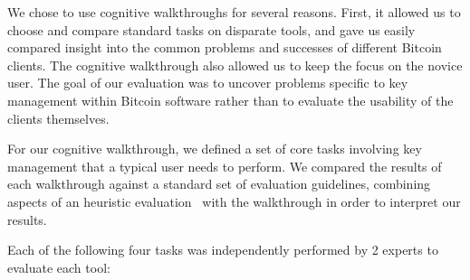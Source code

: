 We chose to use cognitive walkthroughs for several reasons. First, it allowed us to choose and compare standard tasks on disparate tools, and gave us easily compared insight into the common problems and successes of different Bitcoin clients. The cognitive walkthrough also allowed us to keep the focus on the novice user. The goal of our evaluation was to uncover problems specific to key management within Bitcoin software rather than to evaluate the usability of the clients themselves.



For our cognitive walkthrough, we defined a set of core tasks involving key management that a typical user needs to perform. We compared the results of each walkthrough against a standard set of evaluation guidelines, combining aspects of an heuristic evaluation~\cite{HeuristicEvaluation} with the walkthrough in order to interpret our results. 

Each of the following four tasks was independently performed by 2 experts to evaluate each tool:

